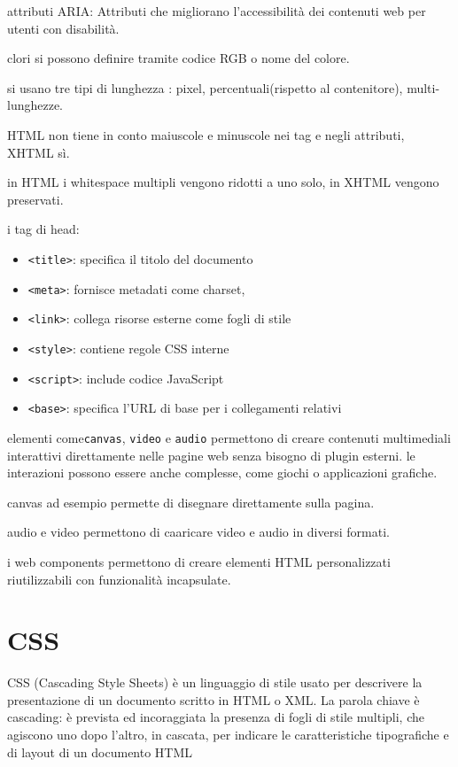 \documentclass[12pt]{article}
\begin{document}
attributi ARIA: Attributi che migliorano l'accessibilità dei contenuti web per utenti con disabilità.

clori si possono definire tramite codice RGB o nome del colore.

si usano tre tipi di lunghezza : pixel, percentuali(rispetto al contenitore), multi-lunghezze.

HTML non tiene in conto maiuscole e minuscole nei tag e negli attributi, XHTML sì.

in HTML i whitespace multipli vengono ridotti a uno solo, in XHTML vengono preservati.

i tag di head:
\begin{itemize}
\item \texttt{<title>}: specifica il titolo del documento
\item \texttt{<meta>}: fornisce metadati come charset,
\item \texttt{<link>}: collega risorse esterne come fogli di stile
\item \texttt{<style>}: contiene regole CSS interne
\item \texttt{<script>}: include codice JavaScript
\item \texttt{<base>}: specifica l'URL di base per i collegamenti relativi
\end{itemize}

elementi come\texttt{canvas}, \texttt{video} e \texttt{audio} permettono di creare contenuti multimediali interattivi direttamente nelle pagine web senza bisogno di plugin esterni.
le interazioni possono essere anche complesse, come giochi o applicazioni grafiche.

canvas ad esempio permette di disegnare direttamente sulla pagina.

audio e video permettono di caaricare video e audio in diversi formati.

i web components permettono di creare elementi HTML personalizzati riutilizzabili con funzionalità incapsulate.

\section{CSS}

CSS (Cascading Style Sheets) è un linguaggio di stile usato per descrivere la presentazione di un documento scritto in HTML o XML.
La parola chiave è cascading: è prevista ed incoraggiata la
presenza di fogli di stile multipli, che agiscono uno dopo
l'altro, in cascata, per indicare le caratteristiche
tipografiche e di layout di un documento HTML
\end{document}
